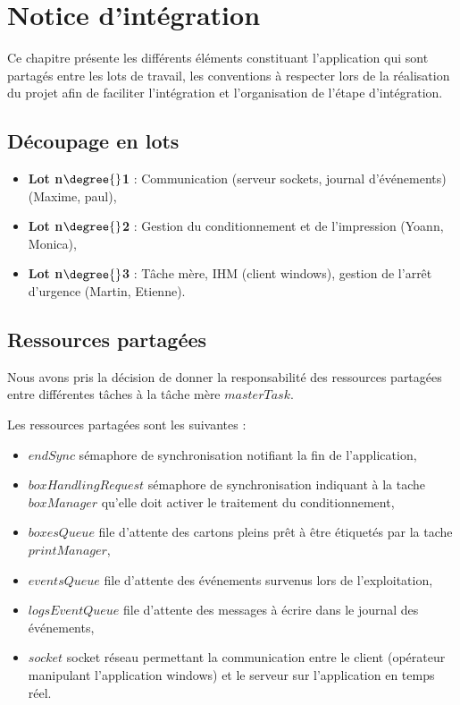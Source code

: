\chapter{Notice d'intégration}

Ce chapitre présente les différents éléments constituant l'application qui sont
partagés entre les lots de travail, les conventions à respecter lors de la
réalisation du projet afin de faciliter l'intégration et l'organisation de
l'étape d'intégration.

\section{Découpage en lots}

\begin{itemize}
	\item \textbf{Lot n$\degree{}$1} : Communication (serveur sockets, journal
d'événements) (Maxime, paul),
	\item \textbf{Lot n$\degree{}$2} : Gestion du conditionnement et de l'impression
(Yoann, Monica),
	\item \textbf{Lot n$\degree{}$3} : Tâche mère, IHM (client windows), gestion de
l'arrêt d'urgence (Martin, Etienne).
\end{itemize}

\section{Ressources partagées}

Nous avons pris la décision de donner la responsabilité des ressources
partagées entre différentes tâches à la tâche mère $masterTask$.

Les ressources partagées sont les suivantes :

\begin{itemize}
	\item $endSync$ sémaphore de synchronisation notifiant la fin de
l'application,
	\item $boxHandlingRequest$ sémaphore de synchronisation indiquant à la
tache $boxManager$ qu'elle doit activer le traitement du conditionnement,
	\item $boxesQueue$ file d'attente des cartons pleins prêt à être étiquetés
par la tache $printManager$,
	\item $eventsQueue$ file d'attente des événements survenus lors de
l'exploitation,
	\item $logsEventQueue$ file d'attente des messages à écrire dans le journal
des événements,
	\item $socket$ socket réseau permettant la communication entre le client
(opérateur manipulant l'application windows) et le serveur sur l'application en
temps réel.
\end{itemize}

